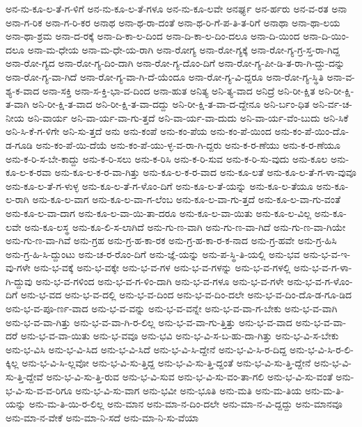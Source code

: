 {ಅನ-ನು-ಕೂ-ಲ-ತೆ-ಗ-ಳಿಗೆ
ಅನ-ನು-ಕೂ-ಲ-ತೆ-ಗಳೂ
ಅನ-ನು-ಕೂ-ಲವೇ
ಅನರ್ಘ್ಯ
ಅನ-ರ್ಹರು
ಅನ-ವ-ರತ
ಅನಾ
ಅನಾ-ಗ-ರಿಕ
ಅನಾ-ಗ-ರಿ-ಕರ
ಅನಾಥ
ಅನಾ-ಥ-ರಾ-ದಂತೆ
ಅನಾ-ಥ-ರಿ-ಗೆ-ಪ-ತಿ-ತ-ರಿಗೆ
ಅನಾಥಾ
ಅನಾ-ಥಾ-ಲಯ
ಅನಾ-ಥಾ-ಶ್ರಮ
ಅನಾ-ದ-ರಕ್ಕೆ
ಅನಾ-ದಿ-ಕಾ-ಲ-ದಿಂದ
ಅನಾ-ದಿ-ಕಾ-ಲ-ದಿಂ-ದಲೂ
ಅನಾ-ದಿ-ಯಿಂದ
ಅನಾ-ದಿ-ಯಿಂ-ದಲೂ
ಅನಾ-ಮ-ಧೇಯ
ಅನಾ-ಮ-ಧೇ-ಯ-ರಾಗಿ
ಅನಾ-ರೋಗ್ಯ
ಅನಾ-ರೋ-ಗ್ಯಕ್ಕೆ
ಅನಾ-ರೋ-ಗ್ಯ-ಗ್ರ-ಸ್ತ-ರಾ-ಗಿದ್ದ
ಅನಾ-ರೋ-ಗ್ಯದ
ಅನಾ-ರೋ-ಗ್ಯ-ದಿಂ-ದಾಗಿ
ಅನಾ-ರೋ-ಗ್ಯ-ದೊಂ-ದಿಗೆ
ಅನಾ-ರೋ-ಗ್ಯ-ಪೀ-ಡಿ-ತ-ರಾ-ಗಿ-ದ್ದು-ದನ್ನು
ಅನಾ-ರೋ-ಗ್ಯ-ವಾ-ಗಿದೆ
ಅನಾ-ರೋ-ಗ್ಯ-ವಾ-ಗಿ-ದೆ-ಯೆಂದೂ
ಅನಾ-ರೋ-ಗ್ಯ-ವಿ-ದ್ದರೂ
ಅನಾ-ರೋ-ಗ್ಯ-ಸ್ಥಿತಿ
ಅನಾ-ವ-ಶ್ಯ-ಕ-ವಾದ
ಅನಾ-ಸಕ್ತಿ
ಅನಾ-ಸ-ಕ್ತಿ-ಭಾ-ವ-ದಿಂದ
ಅನಾ-ಹುತ
ಅನಿತ್ಯ
ಅನಿ-ತ್ಯ-ವಾದ
ಅನಿದ್ರೆ
ಅನಿ-ರೀ-ಕ್ಷಿತ
ಅನಿ-ರೀ-ಕ್ಷಿ-ತ-ವಾಗಿ
ಅನಿ-ರೀ-ಕ್ಷಿ-ತ-ವಾದ
ಅನಿ-ರೀ-ಕ್ಷಿ-ತ-ವಾ-ದದ್ದು
ಅನಿ-ರೀ-ಕ್ಷಿ-ತ-ವಾ-ದ-ದ್ದೇನೂ
ಅನಿ-ರ್ಬಂ-ಧಿತ
ಅನಿ-ರ್ವ-ಚ-ನೀಯ
ಅನಿ-ವಾರ್ಯ
ಅನಿ-ವಾ-ರ್ಯ-ವಾ-ಗು-ತ್ತದೆ
ಅನಿ-ವಾ-ರ್ಯ-ವಾ-ದುದು
ಅನಿ-ವಾ-ರ್ಯ-ವೆಂ-ಬುದು
ಅನಿ-ಸಿಕೆ
ಅನಿ-ಸಿ-ಕೆ-ಗ-ಳಿಗೇ
ಅನಿ-ಸು-ತ್ತದೆ
ಅನು
ಅನು-ಕಂಪೆ
ಅನು-ಕಂ-ಪೆಯ
ಅನು-ಕಂ-ಪೆ-ಯಿಂದ
ಅನು-ಕಂ-ಪೆ-ಯಿಂ-ದೊ-ಡ-ಗೂಡಿ
ಅನು-ಕಂ-ಪೆ-ಯಿ-ದೆಯೆ
ಅನು-ಕಂ-ಪೆ-ಯು-ಳ್ಳ-ವ-ರಾ-ಗಿ-ದ್ದರು
ಅನು-ಕ-ರ-ಣೆಯು
ಅನು-ಕ-ರ-ಣೆಯೂ
ಅನು-ಕ-ರಿ-ಸ-ಬೇ-ಕಾದ್ದು
ಅನು-ಕ-ರಿ-ಸಲು
ಅನು-ಕ-ರಿಸಿ
ಅನು-ಕ-ರಿ-ಸುವ
ಅನು-ಕ-ರಿ-ಸು-ವುದು
ಅನು-ಕೂಲ
ಅನು-ಕೂ-ಲ-ಕ-ರವಾ
ಅನು-ಕೂ-ಲ-ಕ-ರ-ವಾ-ಗಿತ್ತು
ಅನು-ಕೂ-ಲ-ಕ-ರ-ವಾದ
ಅನು-ಕೂ-ಲತೆ
ಅನು-ಕೂ-ಲ-ತೆ-ಗ-ಳಾ-ವುವೂ
ಅನು-ಕೂ-ಲ-ತೆ-ಗ-ಳುಳ್ಳ
ಅನು-ಕೂ-ಲ-ತೆ-ಗ-ಳೊಂ-ದಿಗೆ
ಅನು-ಕೂ-ಲ-ತೆ-ಯನ್ನು
ಅನು-ಕೂ-ಲ-ತೆಯೂ
ಅನು-ಕೂ-ಲ-ರಾಗಿ
ಅನು-ಕೂ-ಲ-ವಾಗ
ಅನು-ಕೂ-ಲ-ವಾ-ಗ-ಲೆಂಬ
ಅನು-ಕೂ-ಲ-ವಾ-ಗು-ತ್ತದೆ
ಅನು-ಕೂ-ಲ-ವಾ-ಗು-ವಂತೆ
ಅನು-ಕೂ-ಲ-ವಾ-ದಾಗ
ಅನು-ಕೂ-ಲ-ವಾ-ಯಿ-ತಾ-ದರೂ
ಅನು-ಕೂ-ಲ-ವಾ-ಯಿತು
ಅನು-ಕೂ-ಲ-ವಿಲ್ಲ
ಅನು-ಕೂ-ಲವೇ
ಅನು-ಕೂ-ಲಸ್ಥ
ಅನು-ಕೂ-ಲಿ-ಸ-ಲಾಗಿದೆ
ಅನು-ಗು-ಣ-ವಾಗಿ
ಅನು-ಗು-ಣ-ವಾ-ಗಿದೆ
ಅನು-ಗು-ಣ-ವಾ-ಗಿಯೇ
ಅನು-ಗು-ಣ-ವಾ-ಗಿವೆ
ಅನು-ಗ್ರಹ
ಅನು-ಗ್ರ-ಹ-ಕಾ-ರಕ
ಅನು-ಗ್ರ-ಹ-ಕಾ-ರ-ಕ-ನಾದ
ಅನು-ಗ್ರ-ಹವೇ
ಅನು-ಗ್ರ-ಹಿಸಿ
ಅನು-ಗ್ರ-ಹಿ-ಸಿ-ದ್ದುಂಟು
ಅನು-ಚ-ರ-ರೊಂ-ದಿಗೆ
ಅನು-ಜ್ಞೆ-ಯನ್ನು
ಅನು-ಪ-ಸ್ಥಿ-ತಿ-ಯಲ್ಲಿ
ಅನು-ಭವ
ಅನು-ಭ-ವ-ಇ-ವು-ಗಳೇ
ಅನು-ಭ-ವಕ್ಕೆ
ಅನು-ಭ-ವಕ್ಕೇ
ಅನು-ಭ-ವ-ಗಳ
ಅನು-ಭ-ವ-ಗಳನ್ನು
ಅನು-ಭ-ವ-ಗಳಲ್ಲಿ
ಅನು-ಭ-ವ-ಗ-ಳಾ-ಗಿ-ದ್ದುವು
ಅನು-ಭ-ವ-ಗಳಿಂದ
ಅನು-ಭ-ವ-ಗ-ಳಿಂ-ದಾಗಿ
ಅನು-ಭ-ವ-ಗಳೂ
ಅನು-ಭ-ವ-ಗಳೇ
ಅನು-ಭ-ವ-ಗ-ಳೊಂ-ದಿಗೆ
ಅನು-ಭ-ವದ
ಅನು-ಭ-ವ-ದಲ್ಲಿ
ಅನು-ಭ-ವ-ದಿಂದ
ಅನು-ಭ-ವ-ದಿಂ-ದಲೇ
ಅನು-ಭ-ವ-ದಿಂ-ದೊ-ಡ-ಗೂ-ಡಿದ
ಅನು-ಭ-ವ-ಪೂ-ರ್ಣ-ವಾದ
ಅನು-ಭ-ವ-ವನ್ನು
ಅನು-ಭ-ವ-ವನ್ನೇ
ಅನು-ಭ-ವ-ವಾ-ಗ-ಬೇಕು
ಅನು-ಭ-ವ-ವಾಗಿ
ಅನು-ಭ-ವ-ವಾ-ಗಿತ್ತು
ಅನು-ಭ-ವ-ವಾ-ಗಿ-ರ-ಲಿಲ್ಲ
ಅನು-ಭ-ವ-ವಾ-ಗು-ತ್ತಿತ್ತು
ಅನು-ಭ-ವ-ವಾದ
ಅನು-ಭ-ವ-ವಾ-ದರೆ
ಅನು-ಭ-ವ-ವಾ-ಯಿತು
ಅನು-ಭ-ವವೂ
ಅನು-ಭವಿ
ಅನು-ಭ-ವಿ-ಸ-ಬ-ಹು-ದಾ-ಗಿತ್ತು
ಅನು-ಭ-ವಿ-ಸ-ಬೇಕು
ಅನು-ಭ-ವಿಸಿ
ಅನು-ಭ-ವಿ-ಸಿದ
ಅನು-ಭ-ವಿ-ಸಿದೆ
ಅನು-ಭ-ವಿ-ಸಿ-ದ್ದೇನೆ
ಅನು-ಭ-ವಿ-ಸಿ-ರ-ದಿದ್ದ
ಅನು-ಭ-ವಿ-ಸಿ-ರ-ಲಿ-ಕ್ಕಿಲ್ಲ
ಅನು-ಭ-ವಿ-ಸಿ-ಲ್ಲವೋ
ಅನು-ಭ-ವಿ-ಸು-ತ್ತಿದ್ದ
ಅನು-ಭ-ವಿ-ಸು-ತ್ತಿ-ದ್ದಂತೆ
ಅನು-ಭ-ವಿ-ಸು-ತ್ತಿ-ದ್ದೇನೆ
ಅನು-ಭ-ವಿ-ಸು-ತ್ತಿ-ದ್ದೇವೆ
ಅನು-ಭ-ವಿ-ಸು-ತ್ತಿ-ರುವ
ಅನು-ಭ-ವಿ-ಸುವ
ಅನು-ಭ-ವಿ-ಸು-ವಂ-ತಾ-ಗಲಿ
ಅನು-ಭ-ವಿ-ಸು-ವಂತೆ
ಅನು-ಭ-ವಿ-ಸು-ವ-ವ-ರಿಗೂ
ಅನು-ಭ-ವಿ-ಸು-ವಾಗ
ಅನು-ಭವೀ
ಅನು-ಭೂತಿ
ಅನು-ಮತಿ
ಅನು-ಮ-ತಿಯ
ಅನು-ಮ-ತಿ-ಯನ್ನು
ಅನು-ಮ-ತಿ-ಯಿ-ರ-ಲಿಲ್ಲ
ಅನು-ಮಾನ
ಅನು-ಮಾ-ನ-ದಿಂ-ದಲೇ
ಅನು-ಮಾ-ನ-ವಿ-ದ್ದದ್ದು
ಅನು-ಮಾನವೂ
ಅನು-ಮಾ-ನ-ವೇಕೆ
ಅನು-ಮಾ-ನಿ-ಸದೆ
ಅನು-ಮಾ-ನಿ-ಸು-ವೆಯಾ
}
